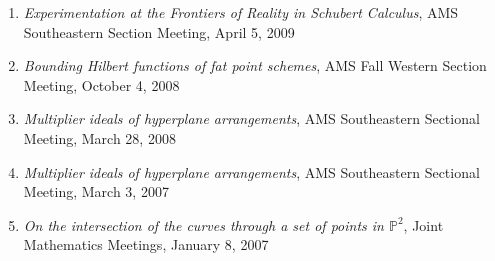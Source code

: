 \documentclass[12pt]{article}
\begin{document}
\begin{enumerate}
\item \textit{Experimentation at the Frontiers of Reality in Schubert Calculus},
AMS Southeastern Section Meeting, April 5, 2009

\item \textit{Bounding Hilbert functions of fat point schemes},
AMS Fall Western Section Meeting, October 4, 2008

\item \textit{Multiplier ideals of hyperplane arrangements},
AMS Southeastern Sectional Meeting, March 28, 2008

\item \textit{Multiplier ideals of hyperplane arrangements},
AMS Southeastern Sectional Meeting, March 3, 2007

\item \textit{On the intersection of the curves through a set of points in $\mathbb{P}^2$},
Joint Mathematics Meetings, January 8, 2007




\end{enumerate}


\end{document}
